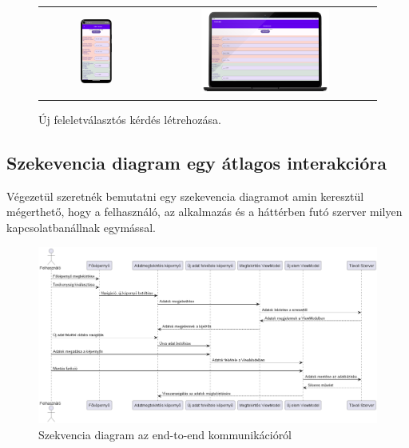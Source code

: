 \begin{figure}[!ht]
    \centering
    \begin{tabular}{cc}
        \includegraphics[width=0.3\textwidth, keepaspectratio]{figures/Submission_Android.png} & 
        \includegraphics[width=0.6\textwidth, keepaspectratio]{figures/Submission_Desktop_framed.png}
    \end{tabular}
    \caption{Új feleletválasztós kérdés létrehozása.}
    \label{fig:SubmissionScreen}
\end{figure}


\subsection{Szekevencia diagram egy átlagos interakcióra}

Végezetül szeretnék bemutatni egy szekevencia diagramot amin keresztül mégerthető, hogy a felhasználó, az alkalmazás és a háttérben futó szerver milyen kapcsolatbanállnak egymással.

\begin{figure}[!ht]
    \centering
    \includegraphics[width=150mm, keepaspectratio]{figures/Defaut Communication.png}
    \caption{Szekvencia diagram az end-to-end kommunikációról}
    \label{fig:DefaultCommunication}
\end{figure}

